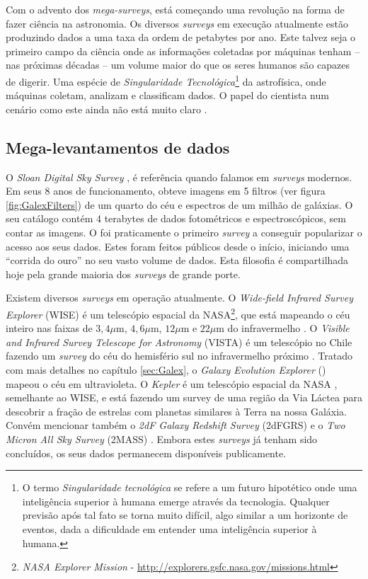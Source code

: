 Com o advento dos {\em mega-surveys}, está começando uma revolução na forma de
fazer ciência na astronomia. Os diversos {\em surveys} em execução atualmente
estão produzindo dados a uma taxa da ordem de petabytes por ano. Este talvez
seja o primeiro campo da ciência onde as informações coletadas por máquinas
tenham -- nas próximas décadas -- um volume maior do que os seres humanos são
capazes de digerir. Uma espécie de {\em Singularidade Tecnológica}\footnote{O
termo {\em Singularidade tecnológica} se refere a um futuro hipotético onde uma
inteligência superior à humana emerge através da tecnologia. Qualquer previsão
após tal fato se torna muito difícil, algo similar a um horizonte de eventos,
dada a dificuldade em entender uma inteligência superior à humana.} da
astrofísica, onde máquinas coletam, analizam e classificam dados. O papel do
cientista num cenário como este ainda não está muito claro \citep{Norris2010}.

\subsection{Mega-levantamentos de dados}

O {\em Sloan Digital Sky Survey} \citep[\SDSS]{York2000}, é referência quando
falamos em {\em surveys} modernos. Em seus 8 anos de funcionamento, obteve
imagens em 5 filtros (ver figura \ref{fig:GalexFilters}) de um quarto do céu e
espectros de um milhão de galáxias. O seu catálogo contém 4 terabytes de dados
fotométricos e espectroscópicos, sem contar as imagens. O \SDSS foi praticamente
o primeiro {\em survey} a conseguir popularizar o acesso aos seus dados. Estes
foram feitos públicos desde o início, iniciando uma ``corrida do ouro'' no seu
vasto volume de dados. Esta filosofia é compartilhada hoje pela grande maioria
dos {\em surveys} de grande porte.

Existem diversos {\em surveys} em operação atualmente. O {\em Wide-field
Infrared Survey Explorer} (WISE) é um telescópio espacial da NASA\footnote{{\em
NASA Explorer Mission} - \url{http://explorers.gsfc.nasa.gov/missions.html}},
que está mapeando o céu inteiro nas faixas de $3,4\mu$m, $4,6\mu$m, $12\mu$m e
$22\mu$m do infravermelho \citep{Wright2010}. O {\em Visible and Infrared Survey
Telescope for Astronomy} (VISTA) é um telescópio no Chile fazendo um {\em
survey} do céu do hemisfério sul no infravermelho próximo \citep{Born2010}.
Tratado com mais detalhes no capítulo \ref{sec:Galex}, o {\em Galaxy Evolution
Explorer} (\galex) mapeou o céu em ultravioleta. O {\em Kepler} é um telescópio
espacial da NASA \citep{Borucki2010}, semelhante ao WISE, e está fazendo um
survey de uma região da Via Láctea para descobrir a fração de estrelas com
planetas similares à Terra na nossa Galáxia. Convém mencionar também o {\em 2dF
Galaxy Redshift Survey} (2dFGRS) \citep{Colless1999} e o {\em Two Micron All Sky
Survey} (2MASS) \citep{Skrutskie2006}. Embora estes {\em surveys} já tenham sido
concluídos, os seus dados permanecem disponíveis publicamente.

